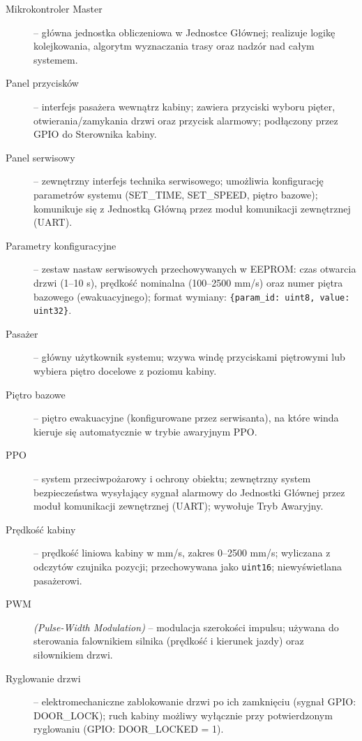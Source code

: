 \documentclass{article}
\begin{document}
\begin{description}
  \item[Mikrokontroler Master] – główna jednostka obliczeniowa w Jednostce Głównej; realizuje logikę kolejkowania, algorytm wyznaczania trasy oraz nadzór nad całym systemem.

  \item[Panel przycisków] – interfejs pasażera wewnątrz kabiny; zawiera przyciski wyboru pięter, otwierania/zamykania drzwi oraz przycisk alarmowy; podłączony przez GPIO do Sterownika kabiny.

  \item[Panel serwisowy] – zewnętrzny interfejs technika serwisowego; umożliwia konfigurację parametrów systemu (SET\_TIME, SET\_SPEED, piętro bazowe); komunikuje się z Jednostką Główną przez moduł komunikacji zewnętrznej (UART).

  \item[Parametry konfiguracyjne] – zestaw nastaw serwisowych przechowywanych w EEPROM: czas otwarcia drzwi (1–10 s), prędkość nominalna (100–2500 mm/s) oraz numer piętra bazowego (ewakuacyjnego); format wymiany: \texttt{\{param\_id: uint8, value: uint32\}}.

  \item[Pasażer] – główny użytkownik systemu; wzywa windę przyciskami piętrowymi lub wybiera piętro docelowe z poziomu kabiny.

  \item[Piętro bazowe] – piętro ewakuacyjne (konfigurowane przez serwisanta), na które winda kieruje się automatycznie w trybie awaryjnym PPO.

  \item[PPO] – system przeciwpożarowy i ochrony obiektu; zewnętrzny system bezpieczeństwa wysyłający sygnał alarmowy do Jednostki Głównej przez moduł komunikacji zewnętrznej (UART); wywołuje Tryb Awaryjny.

  \item[Prędkość kabiny] – prędkość liniowa kabiny w mm/s, zakres 0–2500 mm/s; wyliczana z odczytów czujnika pozycji; przechowywana jako \texttt{uint16}; niewyświetlana pasażerowi.

  \item[PWM] \textit{(Pulse-Width Modulation)} – modulacja szerokości impulsu; używana do sterowania falownikiem silnika (prędkość i kierunek jazdy) oraz siłownikiem drzwi.

  \item[Ryglowanie drzwi] – elektromechaniczne zablokowanie drzwi po ich zamknięciu (sygnał GPIO: DOOR\_LOCK); ruch kabiny możliwy wyłącznie przy potwierdzonym ryglowaniu (GPIO: DOOR\_LOCKED = 1).


\end{description}
\end{document}
